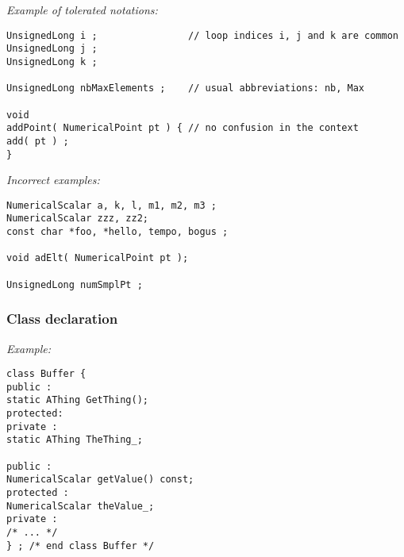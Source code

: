 \emph{Example of tolerated notations:}
\begin{lstlisting}[frame=TBRL]
UnsignedLong i ;                // loop indices i, j and k are common
UnsignedLong j ;
UnsignedLong k ;

UnsignedLong nbMaxElements ;    // usual abbreviations: nb, Max

void
addPoint( NumericalPoint pt ) { // no confusion in the context
add( pt ) ;
}
\end{lstlisting}

\emph{Incorrect examples:}
\begin{lstlisting}[frame=TBRL]
NumericalScalar a, k, l, m1, m2, m3 ;
NumericalScalar zzz, zz2;
const char *foo, *hello, tempo, bogus ;

void adElt( NumericalPoint pt );

UnsignedLong numSmplPt ;
\end{lstlisting}

\subsubsection{Class declaration}

\emph{Example:}
\lstset{language=C++, basicstyle=\normalsize}
\begin{lstlisting}[frame=TBRL]
class Buffer {
public :
static AThing GetThing();
protected:
private :
static AThing TheThing_;

public :
NumericalScalar getValue() const;
protected :
NumericalScalar theValue_;
private :
/* ... */
} ; /* end class Buffer */
\end{lstlisting}


